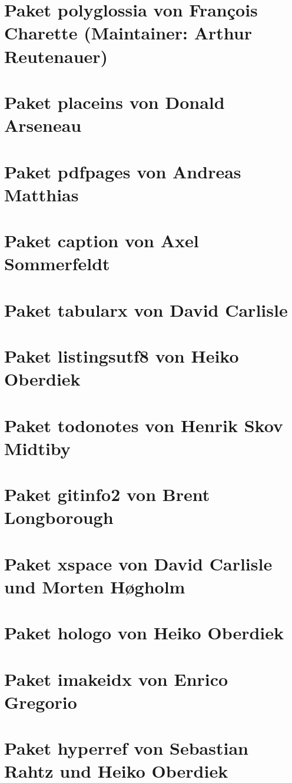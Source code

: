 %
%
	\label{sec:Pakete}



\section{Paket polyglossia von François Charette (Maintainer: Arthur Reutenauer)}
\section{Paket placeins von Donald Arseneau}
\section{Paket pdfpages von Andreas Matthias}
\section{Paket caption von Axel Sommerfeldt}
\section{Paket tabularx von David Carlisle}
\section{Paket listingsutf8 von Heiko Oberdiek}
\section{Paket todonotes von Henrik Skov Midtiby}
\section{Paket gitinfo2 von Brent Longborough}
\section{Paket xspace von David Carlisle und Morten Høgholm}
\section{Paket hologo von Heiko Oberdiek}
\section{Paket imakeidx von Enrico Gregorio}
\section{Paket hyperref von Sebastian Rahtz und Heiko Oberdiek}



